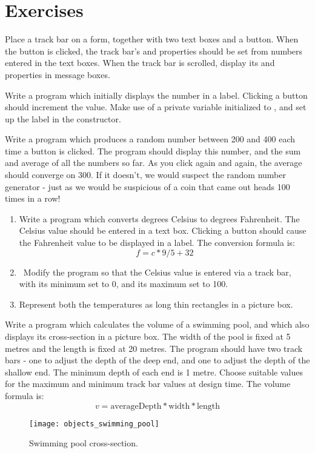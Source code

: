 	\section{Exercises}
		\begin{EXE}
			\item	Place a track bar on a form, together with two text boxes and a button. When the button is clicked, the track bar's  and  properties should be set from numbers entered in the text boxes. When the track bar is scrolled, display its  and  properties in message boxes.
			\item Write a program which initially displays the number  in a label. Clicking a button should increment the value. Make use of a private variable initialized to , and set up the label in the constructor.
			\item Write a program which produces a random number between 200 and 400 each time a button is clicked. The program should display this number, and the sum and average of all the numbers so far. As you click again and again, the average should converge on 300. If it doesn't, we would suspect the random number generator - just as we would be suspicious of a coin that came out heads 100 times in a row!
			\item 
				\begin{enumerate}[label=(\alph*)]
					\item	Write a program which converts degrees Celsius to degrees Fahrenheit. The Celsius value should be entered in a text box. Clicking a button should cause the Fahrenheit value to be displayed in a label. The conversion formula is:
						\begin{equation*}
							f = c * 9 / 5 + 32
						\end{equation*}
					\item Modify the program so that the Celsius value is entered via a track bar, with its minimum set to 0, and its maximum set to 100.
					\item Represent both the temperatures as long thin rectangles in a picture box.
				\end{enumerate}
			\item Write a program which calculates the volume of a swimming pool, and which also displays its cross-section in a picture box. The width of the pool is fixed at 5 metres and the length is fixed at 20 metres. The program should have two track bars - one to adjust the depth of the deep end, and one to adjust the depth of the shallow end. The minimum depth of each end is 1 metre. Choose suitable values for the maximum and minimum track bar values at design time. The volume formula is:
				\begin{equation*}
					v = \text{averageDepth} * \text{width} * \text{length}
				\end{equation*}
				\begin{figure}[ht]
					\centering
					\texttt{[image: objects\_swimming\_pool]}
					\caption{Swimming pool cross-section.}
					\label{fig:objects_swimming_pool}
				\end{figure}


\end{EXE}

